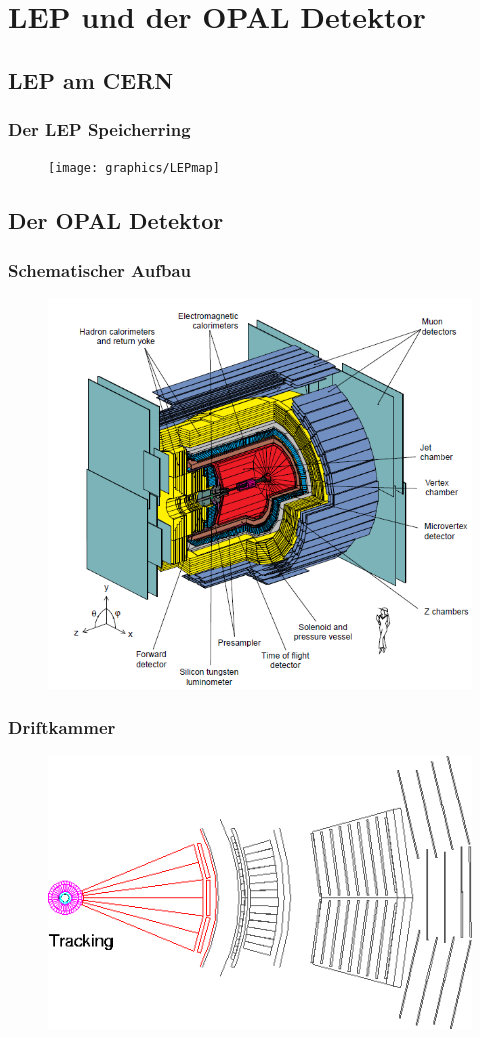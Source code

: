 \section{LEP und der OPAL Detektor}
\subsection{LEP am CERN}
\begin{frame}
	\frametitle{Der LEP Speicherring}
	\begin{figure}
		\texttt{[image: graphics/LEPmap]}
	\end{figure}
\end{frame}

\subsection{Der OPAL Detektor}
\begin{frame}
	\frametitle{Schematischer Aufbau}
	\begin{center}
	\begin{figure}
		\includegraphics[width=0.7\linewidth]{graphics/OPALaufbau}
	\end{figure}
	\end{center}
\end{frame}

\begin{frame}
	\frametitle{Driftkammer}
	\begin{center}
		\begin{figure}
			\includegraphics[width=0.75\linewidth]{graphics/slice_tracking_tr}
		\end{figure}
	\end{center}
\end{frame}

